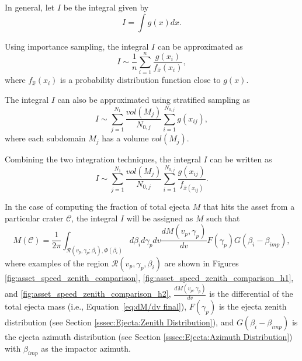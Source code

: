 \documentclass{article}
\begin{document}
In general, let $I$ be the integral given by
\begin{equation}
I = \int g(x)dx.
\end{equation}

Using importance sampling, the integral $I$ can be approximated as
\begin{equation}
I \sim \frac{1}{n}\sum_{i=1}^{n}\frac{g(x_i)}{f_{\hat{x}}(x_i)},
\end{equation}
where $f_{\hat{x}}(x_i)$ is a probability distribution function close to $g(x)$.

The integral $I$ can also be approximated using stratified sampling as
\begin{equation}
I \sim \sum_{j=1}^{N_1}\frac{vol(M_j)}{N_{0,j}}\sum_{i=1}^{N_{0,j}}g(x_{ij}),
\end{equation}
where each subdomain $M_j$ has a volume $vol(M_j)$.

Combining the two integration techniques, the integral $I$ can be written as
\begin{equation}
I \sim \sum_{j=1}^{N_1}\frac{vol(M_j)}{N_{0,j}}\sum_{i=1}^{N_{0,j}}\frac{g(x_{ij})}{f_{\hat{x}(x_{ij})}}.
\end{equation}


In the case of computing the fraction of total ejecta $M$ that hits the asset from a particular crater $\mathcal{C}$, the integral $I$ will be assigned as $M$ such that
\begin{equation}
M(\mathcal{C}) = \frac{1}{2\pi}\int_{\mathcal{R}(v_p,\gamma_p; \beta_i), \Phi(\beta_i)} d\beta_i d\gamma_p dv \frac{dM(v_p,\gamma_p)}{dv} F(\gamma_p) G(\beta_i-\beta_{imp}),
\end{equation}
where examples of the region $\mathcal{R}(v_p,\gamma_p, \beta_i)$ are shown in Figures \ref{fig:asset_speed_zenith_comparison}, \ref{fig:asset_speed_zenith_comparison_h1}, and \ref{fig:asset_speed_zenith_comparison_h2}, $\frac{dM(v_p,\gamma_p)}{dv}$ is the differential of the total ejecta mass (i.e., Equation~\eqref{eq:dM/dv final}), $F(\gamma_p)$ is the ejecta zenith distribution (see Section \ref{sssec:Ejecta:Zenith Distribution}), and $G(\beta_i-\beta_{imp})$ is the ejecta azimuth distribution (see Section \ref{sssec:Ejecta:Azimuth Distribution}) with $\beta_{imp}$ as the impactor azimuth.
\end{document}
